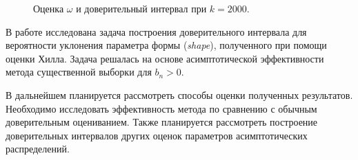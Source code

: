 \documentclass[12pt, specialist, subf, substylefile = spbu.rtx]{disser}
\begin{document}
\begin{figure}[h]
\caption{Оценка $\omega$ и доверительный интервал при $k=2000$.}
\label{ris:dover2}
\end{figure}


\conclusion

В работе исследована задача построения доверительного интервала для вероятности уклонения параметра формы (\textit{shape}), полученного при помощи оценки Хилла. Задача решалась на основе асимптотической эффективности метода существенной выборки для $b_n>0$.

В дальнейшем планируется рассмотреть способы оценки полученных результатов. Необходимо исследовать эффективность метода по сравнению с обычным доверительным оцениванием. Также планируется рассмотреть построение доверительных интервалов других оценок параметров асимптотических распределений. 





\end{document}
